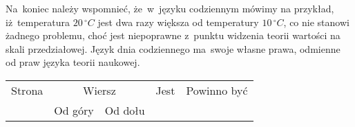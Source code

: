 \documentclass[a4paper,11pt]{article}
\begin{document}
Na~koniec należy wspomnieć, że~w~języku codziennym mówimy na przykład,
iż~temperatura $20 \, {}^{ \circ }\si{C}$ jest dwa razy większa od temperatury
$10 \, {}^{ \circ }\si{C}$, co nie stanowi żadnego problemu, choć jest
niepoprawne z~punktu widzenia teorii wartości na skali przedziałowej. Język
dnia codziennego ma~swoje własne prawa, odmienne od praw języka teorii
naukowej.


























\newpage



\begin{center}

  \begin{tabular}{|c|c|c|c|c|}
    \hline
    Strona & \multicolumn{2}{c|}{Wiersz} & Jest
                              & Powinno być \\ \cline{2-3}
    & Od góry & Od dołu & & \\
    \hline
    \hline
  \end{tabular}

\end{center}

\vspace{\VerSpaceSix}

















{}






\end{document}
